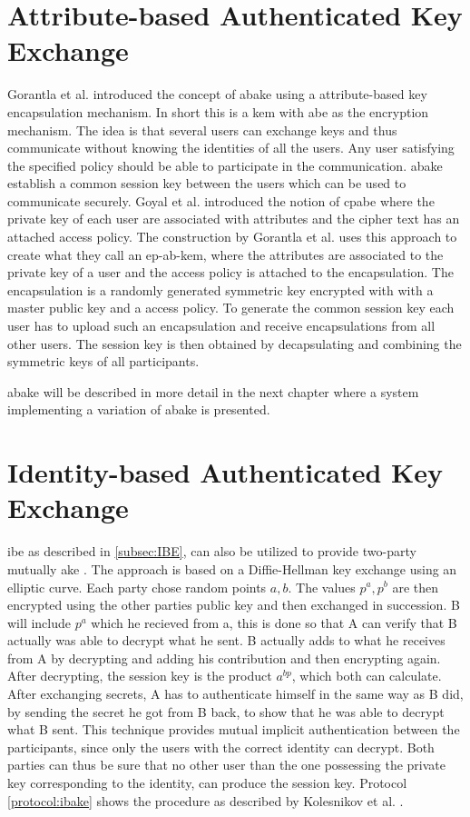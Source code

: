 \section{Attribute-based Authenticated Key Exchange}\label{sec:abake}
Gorantla et al.\cite{gorantla2010attribute} introduced the concept of \gls{abake} using a attribute-based key encapsulation mechanism. In short this is a \gls{kem} with \gls{abe} as the encryption mechanism. The idea is that several users can exchange keys and thus communicate without knowing the identities of all the users. Any user satisfying the specified policy should be able to participate in the communication. \gls{abake} establish a common session key between the users which can be used to communicate securely. Goyal et al. \cite{ABE} introduced the notion of \gls{cpabe} where the private key of each user are associated with attributes and the cipher text has an attached access policy. The construction by Gorantla et al.\cite{gorantla2010attribute} uses this approach to create what they call an \gls{ep-ab-kem}, where the attributes are associated to the private key of a user and the access policy is attached to the encapsulation. The encapsulation is a randomly generated symmetric key encrypted with with a master public key and a access policy. To generate the common session key each user has to upload such an encapsulation and receive encapsulations from all other users. The session key is then obtained by decapsulating and combining the symmetric keys of all participants. 
\par \Gls{abake} will be described in more detail in the next chapter where a system implementing a variation of \gls{abake} is presented. 

\section{Identity-based Authenticated Key Exchange}
\Gls{ibe} as described in \ref{subsec:IBE}, can also be utilized to provide two-party mutually \gls{ake} \cite{ibake}. The approach is based on a Diffie-Hellman key exchange using an elliptic curve. Each party chose random points $a,b$. The values $p^a, p^b$ are then encrypted using the other parties public key and then exchanged in succession. B will include $p^a$ which he recieved from a, this is done so that A can verify that B actually was able to decrypt what he sent. B actually adds to what he receives from A by decrypting and adding his contribution and then encrypting again. After decrypting, the session key is the product $a^{bp}$, which both can calculate. After exchanging secrets, A has to authenticate himself in the same way as B did, by sending the secret he got from B back, to show that he was able to decrypt what B sent. This technique provides mutual implicit authentication between the participants, since only the users with the correct identity can decrypt. Both parties can thus be sure that no other user than the one possessing the private key corresponding to the identity, can produce the session key. Protocol \ref{protocol:ibake} shows the procedure as described by Kolesnikov et al. \cite{ibake}. 

